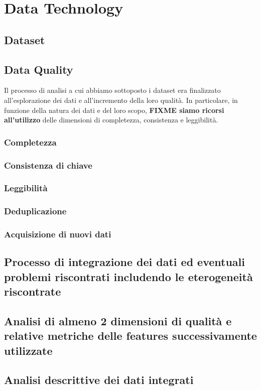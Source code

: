 \setcounter{chapter}{0}

\part{Data Technology}

\chapter{Dataset}

\chapter{Data Quality}
Il processo di analisi a cui abbiamo sottoposto i dataset era finalizzato 
all'esplorazione dei dati e all'incremento della loro qualità. In particolare, 
in funzione della natura dei dati e del loro scopo, \textbf{FIXME siamo ricorsi 
all'utilizzo} delle dimensioni di completezza, consistenza e leggibilità.


\section{Completezza}

\section{Consistenza di chiave}

\section{Leggibilità}

\section{Deduplicazione}

\section{Acquisizione di nuovi dati}

\chapter{Processo di integrazione dei dati ed eventuali problemi riscontrati includendo le eterogeneità riscontrate}



\chapter{Analisi di almeno 2 dimensioni di qualità e relative metriche delle features successivamente utilizzate}
\chapter{Analisi descrittive dei dati integrati}

